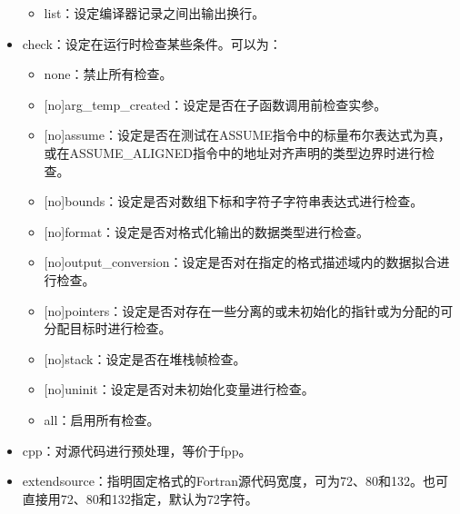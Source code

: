 \documentclass[a4paper,12pt,english]{sphinxmanual}
\begin{document}
\begin{itemize}
\begin{itemize}
\item {} 
\sphinxAtStartPar
list：设定编译器记录之间出输出换行。

\end{itemize}

\item {} 
\sphinxAtStartPar
\sphinxhyphen{}check：设定在运行时检查某些条件。可以为：
\begin{itemize}
\item {} 
\sphinxAtStartPar
none：禁止所有检查。

\item {} 
\sphinxAtStartPar
{[}no{]}arg\_temp\_created：设定是否在子函数调用前检查实参。

\item {} 
\sphinxAtStartPar
{[}no{]}assume：设定是否在测试在ASSUME指令中的标量布尔表达式为真，或在ASSUME\_ALIGNED指令中的地址对齐声明的类型边界时进行检查。

\item {} 
\sphinxAtStartPar
{[}no{]}bounds：设定是否对数组下标和字符子字符串表达式进行检查。

\item {} 
\sphinxAtStartPar
{[}no{]}format：设定是否对格式化输出的数据类型进行检查。

\item {} 
\sphinxAtStartPar
{[}no{]}output\_conversion：设定是否对在指定的格式描述域内的数据拟合进行检查。

\item {} 
\sphinxAtStartPar
{[}no{]}pointers：设定是否对存在一些分离的或未初始化的指针或为分配的可分配目标时进行检查。

\item {} 
\sphinxAtStartPar
{[}no{]}stack：设定是否在堆栈帧检查。

\item {} 
\sphinxAtStartPar
{[}no{]}uninit：设定是否对未初始化变量进行检查。

\item {} 
\sphinxAtStartPar
all：启用所有检查。

\end{itemize}

\item {} 
\sphinxAtStartPar
\sphinxhyphen{}cpp：对源代码进行预处理，等价于\sphinxhyphen{}fpp。

\item {} 
\sphinxAtStartPar
\sphinxhyphen{}extend\sphinxhyphen{}source\sphinxstyleemphasis{{[}size{]}}：指明固定格式的Fortran源代码宽度，可为72、80和132。也可直接用\sphinxhyphen{}72、\sphinxhyphen{}80和\sphinxhyphen{}132指定，默认为72字符。


\end{itemize}
\end{document}

